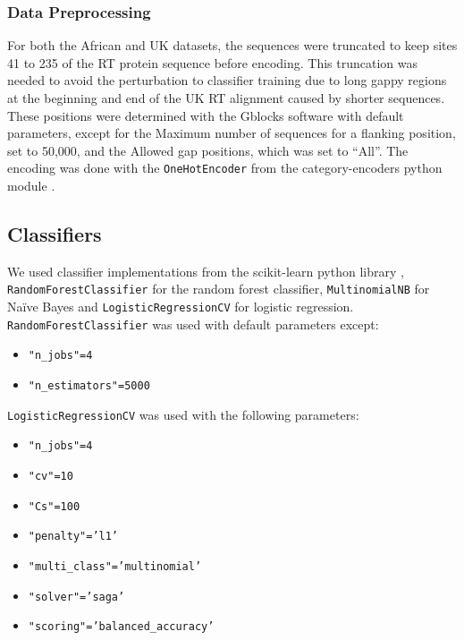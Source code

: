 \documentclass[
  11pt,
  twoside]{scrbook}
\providecommand{\tightlist}{%
  \setlength{\itemsep}{0pt}\setlength{\parskip}{0pt}}
\begin{document}
\hypertarget{data-preprocessing}{%
\subsubsection{Data Preprocessing}\label{data-preprocessing}}

For both the African and UK datasets, the sequences were truncated to keep sites 41 to 235 of the RT protein sequence before encoding. This truncation was needed to avoid the perturbation to classifier training due to long gappy regions at the beginning and end of the UK RT alignment caused by shorter sequences. These positions were determined with the Gblocks software \autocite{castresanaSelectionConservedBlocks2000} with default parameters, except for the Maximum number of sequences for a flanking position, set to 50,000, and the Allowed gap positions, which was set to ``All''. The encoding was done with the \texttt{OneHotEncoder} from the category-encoders python module \autocite{mcginnisScikitLearnContribCategoricalEncodingRelease2018}.

\hypertarget{classifiers}{%
\subsection{Classifiers}\label{classifiers}}

We used classifier implementations from the scikit-learn python library \autocite{pedregosaScikitlearnMachineLearning2011}, \texttt{RandomForestClassifier} for the random forest classifier, \texttt{MultinomialNB} for Naïve Bayes and \texttt{LogisticRegressionCV} for logistic regression.\\
\texttt{RandomForestClassifier} was used with default parameters except:

\begin{itemize}
\tightlist
\item
  \texttt{"n\_jobs"=4}
\item
  \texttt{"n\_estimators"=5000}
\end{itemize}

\texttt{LogisticRegressionCV} was used with the following parameters:

\begin{itemize}
\tightlist
\item
  \texttt{"n\_jobs"=4}
\item
  \texttt{"cv"=10}
\item
  \texttt{"Cs"=100}
\item
  \texttt{"penalty"=’l1’}
\item
  \texttt{"multi\_class"=’multinomial’}
\item
  \texttt{"solver"=’saga’}
\item
  \texttt{"scoring"=’balanced\_accuracy’}
\end{itemize}
\end{document}
